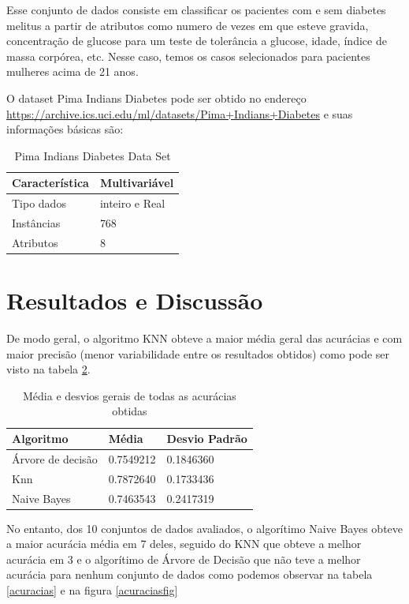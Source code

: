 \documentclass[12pt, a4paper]{article}
\begin{document}
Esse conjunto de dados consiste em classificar os pacientes com e sem diabetes melitus a partir de atributos como numero de vezes em que esteve gravida, concentração de glucose para um teste de tolerância a glucose, idade, índice de massa corpórea, etc.
Nesse caso, temos os casos selecionados para pacientes mulheres acima de 21 anos.

O dataset Pima Indians Diabetes pode ser obtido no endereço \url{https://archive.ics.uci.edu/ml/datasets/Pima+Indians+Diabetes} e suas informações básicas são:
\begin{table}[!ht]
\centering
\caption{Pima Indians Diabetes Data Set}
\label{pimatable}
\begin{tabular}{|l|l|}
\hline
Característica & Multivariável\\
\hline
Tipo dados & inteiro e Real \\
\hline
Instâncias & 768 \\
\hline
Atributos & 8\\
\hline
\end{tabular}
\end{table}

\section{Resultados e Discussão}

De modo geral, o algoritmo KNN obteve a maior média geral das acurácias e com maior precisão (menor variabilidade entre os resultados obtidos) como pode ser visto na tabela \ref{acuracias_geral}.


\begin{table}[!ht]
\centering
\caption{Média e desvios gerais de todas as acurácias obtidas}
\label{acuracias_geral}
\begin{tabular}{|l|l|l|}
\hline
Algoritmo & Média & Desvio Padrão\\
\hline
Árvore de decisão & 0.7549212 &0.1846360\\
Knn & 0.7872640 &0.1733436 \\
Naive Bayes &
0.7463543 &0.2417319\\
\hline
\end{tabular}
\end{table}

No entanto, dos 10 conjuntos de dados avaliados, o algorítimo Naive Bayes obteve a maior acurácia média em 7 deles, seguido do KNN que obteve a melhor acurácia em 3 e o algorítimo de Árvore de Decisão que não teve a melhor acurácia para nenhum conjunto de dados como podemos observar na tabela \ref{acuracias} e na figura \ref{acuraciasfig}
\end{document}
